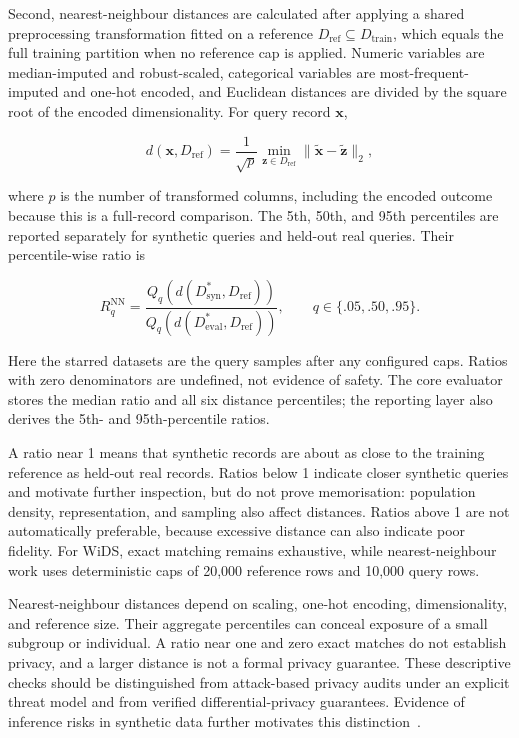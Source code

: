 Second, nearest-neighbour distances are calculated after applying a shared
preprocessing transformation fitted on a reference
$D_{\mathrm{ref}}\subseteq D_{\mathrm{train}}$, which equals the full training
partition when no reference cap is applied. Numeric
variables are median-imputed and robust-scaled, categorical variables are
most-frequent-imputed and one-hot encoded, and Euclidean distances are divided
by the square root of the encoded dimensionality. For query record
$\mathbf{x}$,

\begin{equation}
    d(\mathbf{x},D_{\mathrm{ref}}) =
        \frac{1}{\sqrt{p}}
        \min_{\mathbf{z}\in D_{\mathrm{ref}}}
        \|\widetilde{\mathbf{x}}-\widetilde{\mathbf{z}}\|_2,
    \label{eq:evaluation_nn_distance}
\end{equation}

where $p$ is the number of transformed columns, including the encoded outcome
because this is a full-record comparison. The 5th, 50th, and 95th
percentiles are reported separately for synthetic queries and held-out real
queries. Their percentile-wise ratio is

\begin{equation}
    R_q^{\mathrm{NN}} =
        \frac{Q_q(d(D_{\mathrm{syn}}^{*},D_{\mathrm{ref}}))}
             {Q_q(d(D_{\mathrm{eval}}^{*},D_{\mathrm{ref}}))},
    \qquad q\in\{.05,.50,.95\}.
    \label{eq:evaluation_nn_ratio}
\end{equation}

Here the starred datasets are the query samples after any configured caps.
Ratios with zero denominators are undefined, not evidence of safety. The
core evaluator stores the median ratio and all six distance percentiles;
the reporting layer also derives the 5th- and 95th-percentile ratios.

A ratio near 1 means that synthetic records are about as close to the training
reference as held-out real records. Ratios below 1 indicate closer synthetic
queries and motivate further inspection, but do not prove memorisation:
population density, representation, and sampling also affect distances. Ratios
above 1 are not automatically preferable, because excessive distance can also
indicate poor fidelity. For WiDS, exact matching remains exhaustive, while
nearest-neighbour work uses deterministic caps of 20,000 reference rows and
10,000 query rows.

Nearest-neighbour distances depend on scaling, one-hot encoding, dimensionality,
and reference size. Their aggregate percentiles can conceal exposure of a
small subgroup or individual. A ratio near one and zero exact matches do not
establish privacy, and a larger distance is not a formal privacy guarantee.
These descriptive checks should be distinguished from attack-based privacy
audits under an explicit threat model and from verified differential-privacy
guarantees. Evidence of inference risks in synthetic data further motivates
this distinction~\cite{Stadler2022SyntheticData}.

